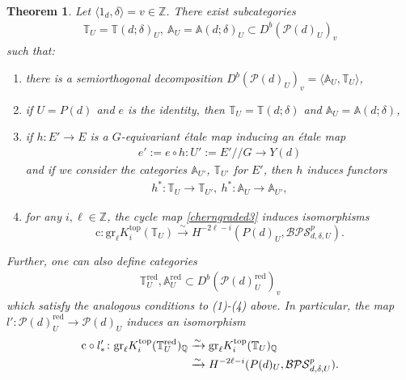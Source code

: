\documentclass [11pt,oneside,a4paper,mathscr]{amsart}
\newtheorem{thm}{Theorem}[section]
\theoremstyle{definition}
\newcommand{\ssslash}{/\!\!/}
\begin{document}
\begin{thm}\label{prop614}
Let $\langle 1_d, \delta \rangle =v\in\mathbb{Z}$.
    There exist subcategories 
    \begin{align*}\mathbb{T}_U=\mathbb{T}(d; \delta)_U, 
    \ \mathbb{A}_U=\mathbb{A}(d; \delta)_U \subset D^b(\mathscr{P}(d)_U)_v
    \end{align*}such that:
\begin{enumerate}
    \item there is a semiorthogonal decomposition $D^b(\mathscr{P}(d)_U)_v=\langle \mathbb{A}_U, \mathbb{T}_U\rangle$,
    \item if $U=P(d)$ and $e$ is the identity, then $\mathbb{T}_U=\mathbb{T}(d; \delta)$ and $\mathbb{A}_U=\mathbb{A}(d; \delta)$,
    \item if $h\colon E'\to E$ is a $G$-equivariant étale map inducing
    an étale map
    \begin{align*}e':=e\circ h\colon 
    U':=E'\ssslash G \to Y(d)
    \end{align*}
    and if we consider the categories $\mathbb{A}_{U'}$, 
    $\mathbb{T}_{U'}$ for $E'$, 
    then $h$ induces functors 
    \begin{align*}h^*\colon \mathbb{T}_U\to \mathbb{T}_{U'}, \ 
    h^*\colon \mathbb{A}_{U}\to \mathbb{A}_{U'}, 
    \end{align*}
    \item for any $i,\ell\in\mathbb{Z}$, the cycle map \eqref{cherngraded3} induces isomorphisms \[\mathrm{c}\colon \mathrm{gr}_\ell K^{\mathrm{top}}_i(\mathbb{T}_U)\xrightarrow{\sim} 
         H^{-2\ell-i}(P(d)_U, \mathcal{BPS}^p_{d, \delta, U}).\]
\end{enumerate}
Further, one can also define categories 
\begin{align*}\mathbb{T}^{\mathrm{red}}_U, \mathbb{A}^{\mathrm{red}}_U\subset D^b(\mathscr{P}(d)_U^{\mathrm{red}})_v
\end{align*}
which satisfy the analogous conditions to (1)-(4) above. In particular, the map $l'\colon \mathscr{P}(d)_U^{\mathrm{red}}\to\mathscr{P}(d)_U$ induces an isomorphism  
\begin{align}\label{lprimec}
\mathrm{c}\circ l'_*\colon \mathrm{gr}_\ell K^{\mathrm{top}}_i(\mathbb{T}_U^{\mathrm{red}})_{\mathbb{Q}}&\xrightarrow{\sim}
\mathrm{gr}_\ell K^{\mathrm{top}}_i(\mathbb{T}_U)_{\mathbb{Q}} \\
&\notag \xrightarrow{\sim} 
         H^{-2\ell-i}(P(d)_U, \mathcal{BPS}^p_{d,\delta,U}).
         \end{align}

\end{thm}
\end{document}
